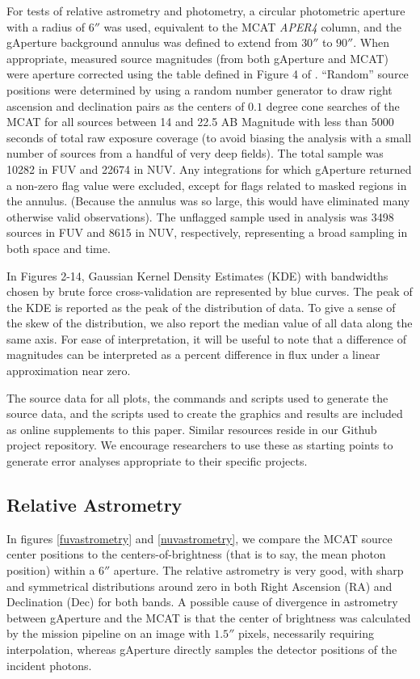 \documentclass[preprint]{aastex}
\begin{document}
For tests of relative astrometry and photometry, a circular photometric aperture with a radius of $6''$ was used, equivalent to the MCAT \emph{APER4} column, and the gAperture background annulus was defined to extend from $30''$ to $90''$. When appropriate, measured source magnitudes (from both gAperture and MCAT) were aperture corrected using the table defined in Figure 4 of \cite{mor2007}. ``Random'' source positions were determined by using a random number generator to draw right ascension and declination pairs as the centers of $0.1$ degree cone searches of the MCAT for all sources between 14 and 22.5 AB Magnitude with less than 5000 seconds of total raw exposure coverage (to avoid biasing the analysis with a small number of sources from a handful of very deep fields). The total sample was 10282 in FUV and 22674 in NUV. Any integrations for which gAperture returned a non-zero flag value were excluded, except for flags related to masked regions in the annulus. (Because the annulus was so large, this would have eliminated many otherwise valid observations). The unflagged sample used in analysis was 3498 sources in FUV and 8615 in NUV, respectively, representing a broad sampling in both space and time.

In Figures 2-14, Gaussian Kernel Density Estimates (KDE) with bandwidths chosen by brute force cross-validation are represented by blue curves. The peak of the KDE is reported as the peak of the distribution of data. To give a sense of the skew of the distribution, we also report the median value of all data along the same axis. For ease of interpretation, it will be useful to note that a difference of magnitudes can be interpreted as a percent difference in flux under a linear approximation near zero.

The source data for all plots, the commands and scripts used to generate the source data, and the scripts used to create the graphics and results are included as online supplements to this paper. Similar resources reside in our Github project repository. We encourage researchers to use these as starting points to generate error analyses appropriate to their specific projects.

\subsection{Relative Astrometry}
In figures \ref{fuvastrometry} and \ref{nuvastrometry}, we compare the MCAT source center positions to the centers-of-brightness (that is to say, the mean photon position) within a $6''$ aperture. The relative astrometry is very good, with sharp and symmetrical distributions around zero in both Right Ascension (RA) and Declination (Dec) for both bands. A possible cause of divergence in astrometry between gAperture and the MCAT is that the center of brightness was calculated by the mission pipeline on an image with $1.5''$ pixels, necessarily requiring interpolation, whereas gAperture directly samples the detector positions of the incident photons.
\end{document}
